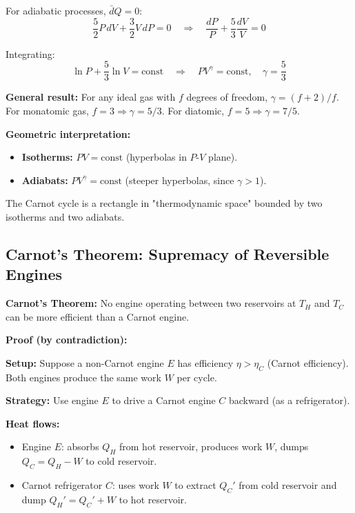 \documentclass[9pt,twocoloumn]{article}
\begin{document}
For adiabatic processes, $\bar{d}Q = 0$:
\begin{equation}
\frac{5}{2} P \, dV + \frac{3}{2} V \, dP = 0 \quad \Rightarrow \quad \frac{dP}{P} + \frac{5}{3} \frac{dV}{V} = 0
\end{equation}

Integrating:
\begin{equation}
\ln P + \frac{5}{3} \ln V = \text{const} \quad \Rightarrow \quad \boxed{PV^{\gamma} = \text{const}, \quad \gamma = \frac{5}{3}}
\end{equation}

\textbf{General result:} For any ideal gas with $f$ degrees of freedom, $\gamma = (f+2)/f$. For monatomic gas, $f = 3 \Rightarrow \gamma = 5/3$. For diatomic, $f = 5 \Rightarrow \gamma = 7/5$.

\textbf{Geometric interpretation:}
\begin{itemize}
    \item \textbf{Isotherms:} $PV = \text{const}$ (hyperbolas in $P$-$V$ plane).
    \item \textbf{Adiabats:} $PV^{\gamma} = \text{const}$ (steeper hyperbolas, since $\gamma > 1$).
\end{itemize}

The Carnot cycle is a rectangle in "thermodynamic space" bounded by two isotherms and two adiabats.

\subsection{Carnot's Theorem: Supremacy of Reversible Engines}

\textbf{Carnot's Theorem:} No engine operating between two reservoirs at $T_H$ and $T_C$ can be more efficient than a Carnot engine.

\textbf{Proof (by contradiction):}

\textbf{Setup:} Suppose a non-Carnot engine $E$ has efficiency $\eta > \eta_C$ (Carnot efficiency). Both engines produce the same work $W$ per cycle.

\textbf{Strategy:} Use engine $E$ to drive a Carnot engine $C$ backward (as a refrigerator).

\textbf{Heat flows:}
\begin{itemize}
    \item Engine $E$: absorbs $Q_H$ from hot reservoir, produces work $W$, dumps $Q_C = Q_H - W$ to cold reservoir.
    \item Carnot refrigerator $C$: uses work $W$ to extract $Q_C'$ from cold reservoir and dump $Q_H' = Q_C' + W$ to hot reservoir.
\end{itemize}
\end{document}
